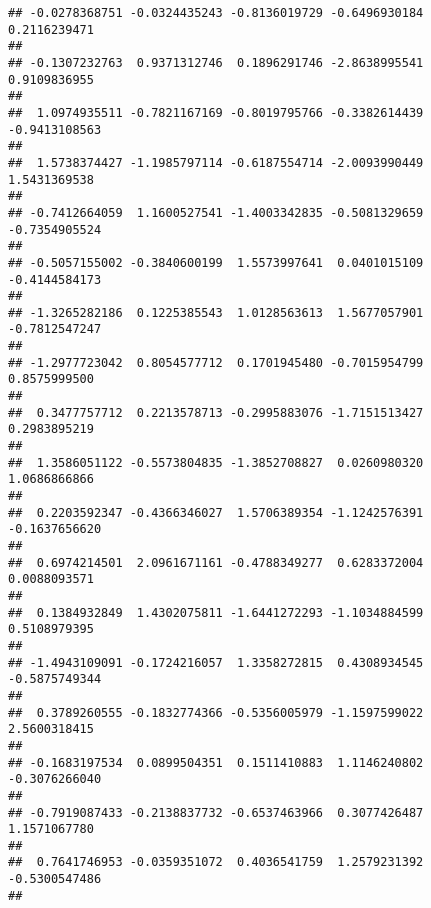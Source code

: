 \documentclass[]{article}
\begin{document}
\begin{verbatim}
## -0.0278368751 -0.0324435243 -0.8136019729 -0.6496930184  0.2116239471 
##                                                                       
## -0.1307232763  0.9371312746  0.1896291746 -2.8638995541  0.9109836955 
##                                                                       
##  1.0974935511 -0.7821167169 -0.8019795766 -0.3382614439 -0.9413108563 
##                                                                       
##  1.5738374427 -1.1985797114 -0.6187554714 -2.0093990449  1.5431369538 
##                                                                       
## -0.7412664059  1.1600527541 -1.4003342835 -0.5081329659 -0.7354905524 
##                                                                       
## -0.5057155002 -0.3840600199  1.5573997641  0.0401015109 -0.4144584173 
##                                                                       
## -1.3265282186  0.1225385543  1.0128563613  1.5677057901 -0.7812547247 
##                                                                       
## -1.2977723042  0.8054577712  0.1701945480 -0.7015954799  0.8575999500 
##                                                                       
##  0.3477757712  0.2213578713 -0.2995883076 -1.7151513427  0.2983895219 
##                                                                       
##  1.3586051122 -0.5573804835 -1.3852708827  0.0260980320  1.0686866866 
##                                                                       
##  0.2203592347 -0.4366346027  1.5706389354 -1.1242576391 -0.1637656620 
##                                                                       
##  0.6974214501  2.0961671161 -0.4788349277  0.6283372004  0.0088093571 
##                                                                       
##  0.1384932849  1.4302075811 -1.6441272293 -1.1034884599  0.5108979395 
##                                                                       
## -1.4943109091 -0.1724216057  1.3358272815  0.4308934545 -0.5875749344 
##                                                                       
##  0.3789260555 -0.1832774366 -0.5356005979 -1.1597599022  2.5600318415 
##                                                                       
## -0.1683197534  0.0899504351  0.1511410883  1.1146240802 -0.3076266040 
##                                                                       
## -0.7919087433 -0.2138837732 -0.6537463966  0.3077426487  1.1571067780 
##                                                                       
##  0.7641746953 -0.0359351072  0.4036541759  1.2579231392 -0.5300547486 
##                                                                       

\end{verbatim}
\end{document}

